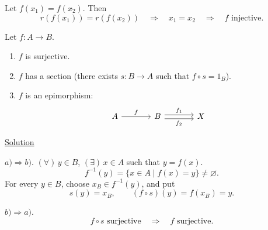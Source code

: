 \medskip
\noindent{}\quad
Let $f(x_1)=f(x_2)$. Then
\[
r(f(x_1))=r(f(x_2))
\quad\Longrightarrow\quad x_1=x_2
\quad\Longrightarrow\quad f\text{ injective}.
\]

\medskip
\noindent{}\quad Let $f:A\longrightarrow B$.
\begin{enumerate}
\item[a)] $f$ is surjective.
\item[b)] $f$ has a section (there exists $s:B\longrightarrow A$ such that $f\circ s=1_B$).
\item[c)] $f$ is an epimorphism:
\[
\begin{tikzcd}[column sep=large]
A \arrow[r,"f"] & B
\arrow[r,shift left=.55ex,"f_1"]
\arrow[r,shift right=.55ex,"f_2"'] & X
\end{tikzcd}
\]
\end{enumerate}

\noindent\underline{Solution}

\noindent $a)\Rightarrow b)$.
\noindent $(\forall)\,y\in B$, $(\exists)\,x\in A$ such that $y=f(x)$.
\[
f^{-1}(y)=\{x\in A\mid f(x)=y\}\neq\varnothing.
\]
\noindent For every $y\in B$, choose $x_B\in f^{-1}(y)$, and put
\[
s(y)=x_B,\qquad (f\circ s)(y)=f(x_B)=y.
\]

\medskip
\noindent $b)\Rightarrow a)$.
\[
f\circ s\text{ surjective}\quad\Longrightarrow\quad f\text{ surjective}.
\]
